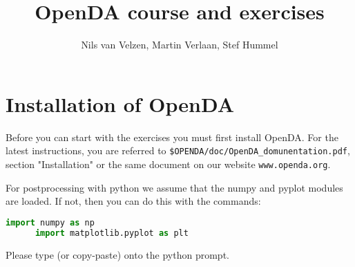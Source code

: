 \documentclass[a4paper,10pt]{article}
\title{OpenDA course and exercises}
\author{Nils van Velzen, Martin Verlaan, Stef Hummel}
\begin{document}

\maketitle



\section*{Installation of OpenDA}
Before you can start with the exercises you must first install OpenDA. For the
latest instructions, you are referred to \verb|$OPENDA/doc/OpenDA_domunentation.pdf|, 
section "Installation" or the same document on our website \verb|www.openda.org|.

For postprocessing with python we assume that the numpy and pyplot modules are loaded. If not, then you
can do this with the commands:
      \begin{lstlisting}[language=Python,frame=single,caption={Python initialize}]
      import numpy as np
      import matplotlib.pyplot as plt
      \end{lstlisting}
Please type (or copy-paste) onto the python prompt.
\end{document}
